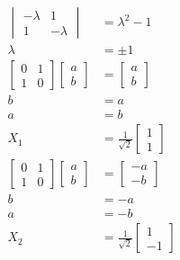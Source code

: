 \documentclass{article}
\begin{document}
\begin{align*}
  \begin{vmatrix}
    -\lambda & 1        \\
    1        & -\lambda
  \end{vmatrix}        & = \lambda^2 - 1                              \\
  \lambda                       & = \pm 1                             \\
  \begin{bmatrix}
    0 & 1 \\
    1 & 0
  \end{bmatrix} \begin{bmatrix}
                  a \\
                  b
                \end{bmatrix} & = \begin{bmatrix}
                                    a \\
                                    b
                                  \end{bmatrix}                      \\
  b                             & = a                                 \\
  a                             & = b                                 \\
  X_1                           & = \frac{1}{\sqrt{2}} \begin{bmatrix}
                                                         1 \\
                                                         1
                                                       \end{bmatrix} \\
  \begin{bmatrix}
    0 & 1 \\
    1 & 0
  \end{bmatrix} \begin{bmatrix}
                  a \\
                  b
                \end{bmatrix} & = \begin{bmatrix}
                                    -a \\
                                    -b
                                  \end{bmatrix}                      \\
  b                             & = -a                                \\
  a                             & = -b                                \\
  X_2                           & = \frac{1}{\sqrt{2}} \begin{bmatrix}
                                                         1 \\
                                                         -1
                                                       \end{bmatrix}
\end{align*}
\end{document}
